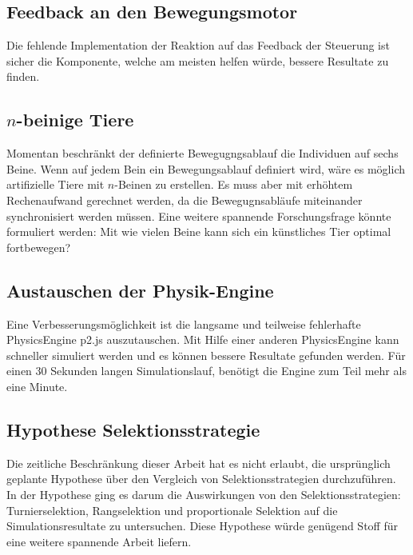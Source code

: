     \subsection{Feedback an den Bewegungsmotor\label{sub:PerspectiveFeedback}}

      Die fehlende Implementation der Reaktion auf das Feedback der Steuerung ist sicher die Komponente,
      welche am meisten helfen würde, bessere Resultate zu finden.

    \subsection{\(n\)-beinige Tiere}


      Momentan beschränkt der definierte Bewegugngsablauf die Individuen auf sechs Beine.
      Wenn auf jedem Bein ein Bewegungsablauf definiert wird, wäre es möglich artifizielle Tiere mit \(n\)-Beinen zu erstellen.
      Es muss aber mit erhöhtem Rechenaufwand gerechnet werden, da die Bewegugnsabläufe miteinander synchronisiert werden müssen.
      Eine weitere spannende Forschungsfrage könnte formuliert werden:
      Mit wie vielen Beine kann sich ein künstliches Tier optimal fortbewegen?

    \subsection{Austauschen der Physik-Engine}

      Eine Verbesserungsmöglichkeit ist die langsame und teilweise fehlerhafte \gls{PhysicsEngine} p2.js auszutauschen.
      Mit Hilfe einer anderen \gls{PhysicsEngine} kann schneller simuliert werden und
      es können bessere Resultate gefunden werden.
      Für einen 30 Sekunden langen Simulationslauf, benötigt die Engine zum Teil mehr als eine Minute.

    \subsection{Hypothese Selektionsstrategie\label{sub:hypoSelect}}

      Die zeitliche Beschränkung dieser Arbeit hat es nicht erlaubt,
      die ursprünglich geplante Hypothese über den Vergleich von Selektionsstrategien durchzuführen.
      In der Hypothese ging es darum die Auswirkungen von den Selektionsstrategien:
      Turnierselektion, Rangselektion
      und proportionale Selektion auf die Simulationsresultate zu untersuchen.
      Diese Hypothese würde genügend Stoff für eine weitere spannende Arbeit liefern.

